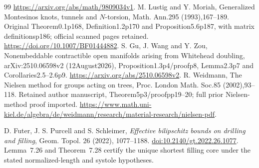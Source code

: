 \documentclass[11pt]{article}
\begin{document}
{\begin{thebibliography}{99}
\url{https://arxiv.org/abs/math/9809034v1}.
 M. Lustig and Y. Moriah, Generalized Montesinos
knots, tunnels and $N$-torsion, Math. Ann.295 (1993),167--189.
Original Theorem0.1p168, Definition1.2p170 and Proposition5.6p187,
with matrix definitionsp186; official scanned pages retained.
\url{https://doi.org/10.1007/BF01444882}.
 S. Gu, J. Wang and Y. Zou, Nonembeddable contractible
open manifolds arising from Whitehead doubling,
arXiv:2510.06598v2 (12August2026), Proposition1.3p4/proofp8,
Lemma2.3p7 and Corollaries2.5--2.6p9.
\url{https://arxiv.org/abs/2510.06598v2}.
 R. Weidmann, The Nielsen method for groups acting
on trees, Proc. London Math. Soc.85 (2002),93--118.
Retained author manuscript, Theorem5p3/proofpp19--20;
full prior Nielsen-method proof imported.
\url{https://www.math.uni-kiel.de/algebra/de/weidmann/research/material-research/nielsen-pdf}.

 D. Futer, J. S. Purcell and S. Schleimer,
\emph{Effective bilipschitz bounds on drilling and filling},
Geom. Topol. 26 (2022), 1077--1188.
\href{https://doi.org/10.2140/gt.2022.26.1077}{doi:10.2140/gt.2022.26.1077}.
Lemma~7.26 and Theorem~7.28 certify the unique shortest filling core
under the stated normalized-length and systole hypotheses.
\end{thebibliography}
}
\end{document}
